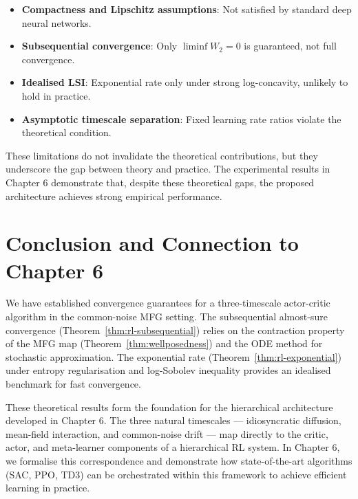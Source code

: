 \begin{itemize}
    \item \textbf{Compactness and Lipschitz assumptions}: Not satisfied by standard
    deep neural networks.
    \item \textbf{Subsequential convergence}: Only $\liminf W_2 = 0$ is guaranteed,
    not full convergence.
    \item \textbf{Idealised LSI}: Exponential rate only under strong log-concavity,
    unlikely to hold in practice.
    \item \textbf{Asymptotic timescale separation}: Fixed learning rate ratios
    violate the theoretical condition.
\end{itemize}

These limitations do not invalidate the theoretical contributions, but they
underscore the gap between theory and practice. The experimental results in Chapter 6
demonstrate that, despite these theoretical gaps, the proposed architecture achieves
strong empirical performance.


\section{Conclusion and Connection to Chapter 6}
\label{sec:rl-conclusion}

We have established convergence guarantees for a three-timescale actor-critic
algorithm in the common-noise MFG setting. The subsequential almost-sure convergence
(Theorem~\ref{thm:rl-subsequential}) relies on the contraction property of the MFG
map (Theorem~\ref{thm:wellposedness}) and the ODE method for stochastic
approximation. The exponential rate (Theorem~\ref{thm:rl-exponential}) under entropy
regularisation and log-Sobolev inequality provides an idealised benchmark for fast
convergence.

These theoretical results form the foundation for the hierarchical architecture
developed in Chapter 6. The three natural timescales --- idiosyncratic diffusion,
mean-field interaction, and common-noise drift --- map directly to the critic,
actor, and meta-learner components of a hierarchical RL system. In Chapter 6, we
formalise this correspondence and demonstrate how state-of-the-art algorithms (SAC,
PPO, TD3) can be orchestrated within this framework to achieve efficient learning in
practice.
